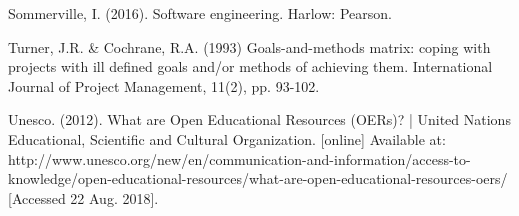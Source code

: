 \begin{thebibliography}{69}
     Sommerville, I. (2016). Software engineering. Harlow: Pearson.

     Turner, J.R. \& Cochrane, R.A. (1993) Goals-and-methods matrix: coping with projects with ill defined goals and/or methods of achieving them. International Journal of Project Management, 11(2), pp. 93-102.
  
     Unesco. (2012). What are Open Educational Resources (OERs)? | United Nations Educational, Scientific and Cultural Organization. [online] Available at: http://www.unesco.org/new/en/communication-and-information/access-to-knowledge/open-educational-resources/what-are-open-educational-resources-oers/ [Accessed 22 Aug. 2018].
 


\end{thebibliography}



